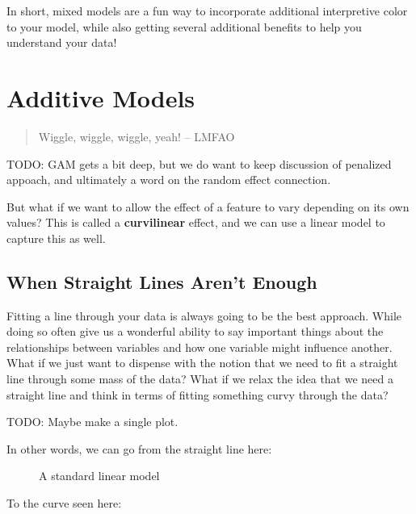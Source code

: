 \documentclass[
  letterpaper,
]{krantz}
\begin{document}
In short, mixed models are a fun way to incorporate additional
interpretive color to your model, while also getting several additional
benefits to help you understand your data!

\section{Additive Models}\label{sec-gam}

\begin{quote}
Wiggle, wiggle, wiggle, yeah! -- LMFAO
\end{quote}

TODO: GAM gets a bit deep, but we do want to keep discussion of
penalized appoach, and ultimately a word on the random effect
connection.

But what if we want to allow the effect of a feature to vary depending
on its own values? This is called a \textbf{curvilinear} effect, and we
can use a linear model to capture this as well.

\subsection{When Straight Lines Aren't Enough}\label{sec-gam-curve}

Fitting a line through your data is always going to be the best
approach. While doing so often give us a wonderful ability to say
important things about the relationships between variables and how one
variable might influence another. What if we just want to dispense with
the notion that we need to fit a straight line through some mass of the
data? What if we relax the idea that we need a straight line and think
in terms of fitting something curvy through the data?

TODO: Maybe make a single plot.

In other words, we can go from the straight line here:

\begin{figure}[H]


\caption{\label{fig-regular-linear-line}A standard linear model}

\end{figure}%

To the curve seen here:
\end{document}
